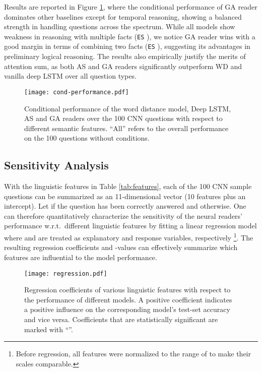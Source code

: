 \documentclass[11pt,a4paper]{article}
\begin{document}
Results are reported in Figure \ref{fig:cond-performance},
where the conditional performance of GA reader dominates other baselines except for temporal reasoning, showing a balanced strength in handling questions across the spectrum. While all models show weakness in reasoning with multiple facts (\texttt{ES} ), we notice GA reader wins with a good margin in terms of combining two facts (\texttt{ES} ), suggesting its advantages in preliminary logical reasoning. The results also empirically justify the merits of attention sum, as both AS and GA readers significantly outperform WD and vanilla deep LSTM over all question types.

\begin{figure}[t]
\centering
\texttt{[image: cond-performance.pdf]}
\caption{Conditional performance of the word distance model, Deep LSTM, AS and GA readers over the 100 CNN questions with respect to different semantic features. ``All'' refers to the overall performance on the 100 questions without conditions.}
\label{fig:cond-performance}
\end{figure}

\subsection{Sensitivity Analysis}
With the linguistic features in Table \ref{tab:features}, each of the 100 CNN sample questions can be summarized as an 11-dimensional vector  (10 features plus an intercept). Let  if the question has been correctly answered and  otherwise. One can therefore quantitatively characterize the sensitivity of the neural readers' performance w.r.t.\ different linguistic features by fitting a linear regression model where  and  are treated as explanatory and response variables, respectively
\footnote{Before regression, all features were normalized to the range of  to make their scales comparable.}.
The resulting regression coefficients and -values can effectively summarize which features are influential to the model performance.

\begin{figure}[t]
\centering
\texttt{[image: regression.pdf]}
\caption{Regression coefficients of various linguistic features with respect to the performance of different models. A positive coefficient indicates a positive influence on the corresponding model's test-set accuracy and vice versa. Coefficients that are statistically significant  are marked with ``''.}
\label{fig:regression}
\end{figure}
\end{document}
